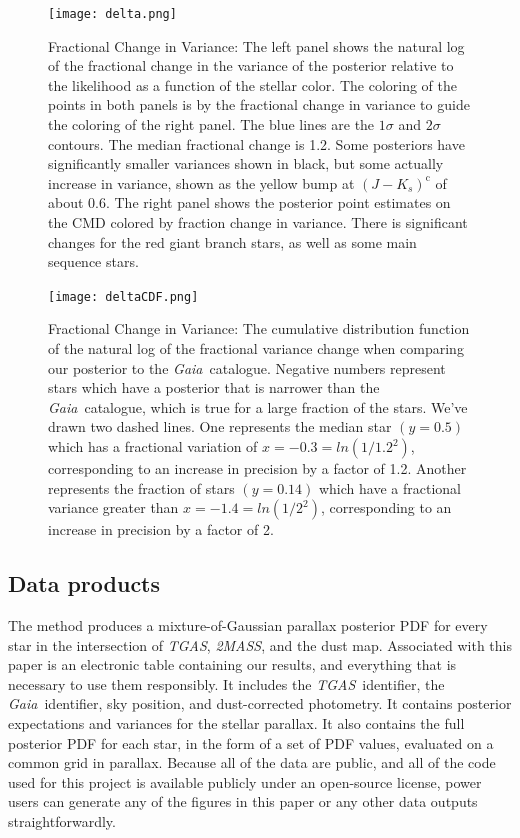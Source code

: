 \documentclass[modern]{aastex61}
\newcommand{\acronym}[1]{{\small{#1}}}
\newcommand{\project}[1]{\textsl{#1}}
\newcommand{\tgas}{\project{\acronym{TGAS}}}
\newcommand{\tmass}{\project{\acronym{2MASS}}}
\newcommand{\gaia}{\project{Gaia}}
\newcommand{\corr}{\mathrm{c}}
\begin{document}
\begin{figure}
\centering
\texttt{[image: delta.png]}
\caption{Fractional Change in Variance: The left panel shows the natural log of the fractional change in the variance of the posterior relative to the likelihood as a function of the stellar color. The coloring of the points in both panels is by the fractional change in variance to guide the coloring of the right panel. The blue lines are the $1\sigma$ and $2\sigma$ contours. The median fractional change is 1.2. Some posteriors have significantly smaller variances shown in black, but some actually increase in variance, shown as the yellow bump at $(J-K_s)^{\corr}$ of about 0.6. The right panel shows the posterior point estimates on the CMD colored by fraction change in variance. There is significant changes for the red giant branch stars, as well as some main sequence stars.}
\label{fig:delta}
\end{figure}

\begin{figure}
\centering
\texttt{[image: deltaCDF.png]}
\caption{Fractional Change in Variance: The cumulative distribution function of the natural log of the fractional variance change when comparing our posterior to the \gaia\ catalogue. Negative numbers represent stars which have a posterior that is narrower than the \gaia\ catalogue, which is true for a large fraction of the stars. We've drawn two dashed lines. One represents the median star $(y=0.5)$ which has a fractional variation of $x=-0.3=ln(1/1.2^2)$, corresponding to an increase in precision by a factor of 1.2. Another represents the fraction of stars $(y=0.14)$ which have a fractional variance greater than $x=-1.4=ln(1/2^2)$, corresponding to an increase in precision by a factor of 2.}
\label{fig:deltaCDF}
\end{figure}

\subsection{Data products}

The method produces a mixture-of-Gaussian parallax posterior PDF for every
star in the intersection of \tgas, \tmass, and the dust map.
Associated with this paper is an electronic table containing our results, and everything
that is necessary to use them responsibly.
It includes the \tgas\ identifier, the \gaia\ identifier, sky position, and dust-corrected
photometry.
It contains posterior expectations and variances for the stellar parallax.
It also contains the full posterior PDF for each star, in the form of a set of PDF values,
evaluated on a common grid in parallax.
Because all of the data are public, and all of the code used for this project is available
publicly under an open-source license, power users can generate any of the figures in this
paper or any other data outputs straightforwardly.
\end{document}
